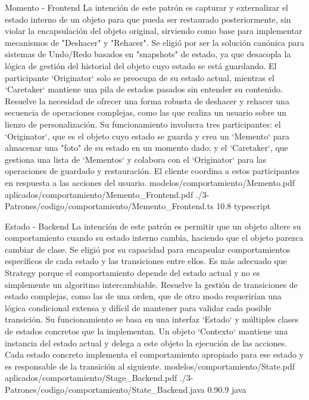 \Patron
    {Momento - Frontend}
    {La intención de este patrón es capturar y externalizar el estado interno de un objeto para que pueda ser restaurado posteriormente, sin violar la encapsulación del objeto original, sirviendo como base para implementar mecanismos de "Deshacer" y "Rehacer". Se eligió por ser la solución canónica para sistemas de Undo/Redo basados en "snapshots" de estado, ya que desacopla la lógica de gestión del historial del objeto cuyo estado se está guardando. El participante `Originator` solo se preocupa de su estado actual, mientras el `Caretaker` mantiene una pila de estados pasados sin entender su contenido.}
    {Resuelve la necesidad de ofrecer una forma robusta de deshacer y rehacer una secuencia de operaciones complejas, como las que realiza un usuario sobre un lienzo de personalización. Su funcionamiento involucra tres participantes: el `Originator`, que es el objeto cuyo estado se guarda y crea un `Memento` para almacenar una "foto" de su estado en un momento dado; y el `Caretaker`, que gestiona una lista de `Mementos` y colabora con el `Originator` para las operaciones de guardado y restauración. El cliente coordina a estos participantes en respuesta a las acciones del usuario.}
    {modelos/comportamiento/Memento.pdf}
    {aplicados/comportamiento/Memento_Frontend.pdf}
    {./3-Patrones/codigo/comportamiento/Memento_Frontend.ts}
    {1}{0.8}
    {typescript}
\newpage

\Patron
    {Estado - Backend}
    {La intención de este patrón es permitir que un objeto altere su comportamiento cuando su estado interno cambia, haciendo que el objeto parezca cambiar de clase. Se eligió por su capacidad para encapsular comportamientos específicos de cada estado y las transiciones entre ellos. Es más adecuado que Strategy porque el comportamiento depende del estado actual y no es simplemente un algoritmo intercambiable.}
    {Resuelve la gestión de transiciones de estado complejas, como las de una orden, que de otro modo requerirían una lógica condicional extensa y difícil de mantener para validar cada posible transición. Su funcionamiento se basa en una interfaz `Estado` y múltiples clases de estados concretos que la implementan. Un objeto `Contexto` mantiene una instancia del estado actual y delega a este objeto la ejecución de las acciones. Cada estado concreto implementa el comportamiento apropiado para ese estado y es responsable de la transición al siguiente.}
    {modelos/comportamiento/State.pdf}
    {aplicados/comportamiento/Stage_Backend.pdf}
    {./3-Patrones/codigo/comportamiento/State_Backend.java}
    {0.9}{0.9}
    {java}
\newpage

